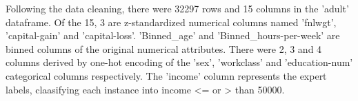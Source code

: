 \documentclass[11pt]{article}
\begin{document}
    Following the data cleaning, there were 32297 rows and 15 columns in the
'adult' dataframe. Of the 15, 3 are z-standardized numerical columns
named 'fnlwgt', 'capital-gain' and 'capital-loss'. 'Binned\_age' and
'Binned\_hours-per-week' are binned columns of the original numerical
attributes. There were 2, 3 and 4 columns derived by one-hot encoding of
the 'sex', 'workclass' and 'education-num' categorical columns
respectively. The 'income' column represents the expert labels,
claasifying each instance into income \textless{}= or \textgreater{}
than 50000.


    
    
    
    
\end{document}
